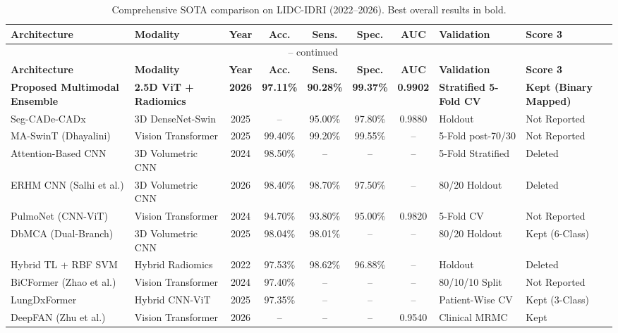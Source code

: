 \documentclass{iopjournal}
\begin{document}
\begin{longtable}{p{3.2cm} p{2.1cm} c c c c c p{1.8cm} p{1.7cm}}
\caption{Comprehensive SOTA comparison on LIDC-IDRI (2022--2026). Best overall
results in bold.}\label{tab:sota}\\
\toprule
\textbf{Architecture} & \textbf{Modality} & \textbf{Year} & \textbf{Acc.} &
\textbf{Sens.} & \textbf{Spec.} & \textbf{AUC} & \textbf{Validation} &
\textbf{Score 3}\\
\midrule
\endfirsthead
\multicolumn{9}{c}{\tablename~\thetable{} -- continued}\\
\toprule
\textbf{Architecture} & \textbf{Modality} & \textbf{Year} & \textbf{Acc.} &
\textbf{Sens.} & \textbf{Spec.} & \textbf{AUC} & \textbf{Validation} &
\textbf{Score 3}\\
\midrule
\endhead
\bottomrule
\endlastfoot
\textbf{Proposed Multimodal Ensemble} & \textbf{2.5D ViT + Radiomics} &
\textbf{2026} & \textbf{97.11\%} & \textbf{90.28\%} & \textbf{99.37\%} &
\textbf{0.9902} & \textbf{Stratified 5-Fold CV} &
\textbf{Kept (Binary Mapped)} \\
\midrule
Seg-CADe-CADx & 3D DenseNet-Swin & 2025 & -- & 95.00\% & 97.80\% & 0.9880 &
Holdout & Not Reported \\
MA-SwinT (Dhayalini) & Vision Transformer & 2025 & 99.40\% & 99.20\% & 99.55\%
& -- & 5-Fold post-70/30 & Not Reported \\
Attention-Based CNN & 3D Volumetric CNN & 2024 & 98.50\% & -- & -- & -- &
5-Fold Stratified & Deleted \\
ERHM CNN (Salhi et al.) & 3D Volumetric CNN & 2026 & 98.40\% & 98.70\% &
97.50\% & -- & 80/20 Holdout & Deleted \\
PulmoNet (CNN-ViT) & Vision Transformer & 2024 & 94.70\% & 93.80\% & 95.00\% &
0.9820 & 5-Fold CV & Not Reported \\
DbMCA (Dual-Branch) & 3D Volumetric CNN & 2025 & 98.04\% & 98.01\% & -- & -- &
80/20 Holdout & Kept (6-Class) \\
Hybrid TL + RBF SVM & Hybrid Radiomics & 2022 & 97.53\% & 98.62\% & 96.88\% &
-- & Holdout & Deleted \\
BiCFormer (Zhao et al.) & Vision Transformer & 2024 & 97.40\% & -- & -- & -- &
80/10/10 Split & Not Reported \\
LungDxFormer & Hybrid CNN-ViT & 2025 & 97.35\% & -- & -- & -- & Patient-Wise CV
& Kept (3-Class) \\
DeepFAN (Zhu et al.) & Vision Transformer & 2026 & -- & -- & -- & 0.9540 &
Clinical MRMC & Kept \\

\end{longtable}
\end{document}

